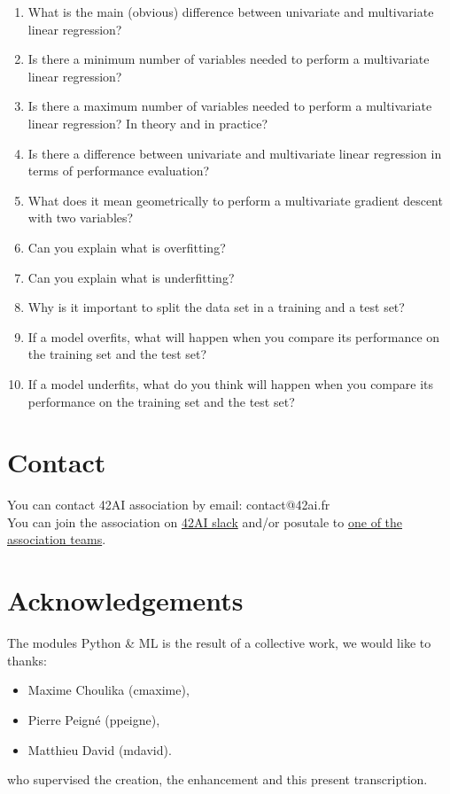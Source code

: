 \documentclass{42-en}
\begin{document}
\begin{enumerate}
  \item What is the main (obvious) difference between univariate and multivariate linear regression?
  \item Is there a minimum number of variables needed to perform a multivariate linear regression?
  \item Is there a maximum number of variables needed to perform a multivariate linear regression?
        In theory and in practice?
  \item Is there a difference between univariate and multivariate linear regression in terms of performance evaluation?
  \item What does it mean geometrically to perform a multivariate gradient descent with two variables?
  \item Can you explain what is overfitting?
  \item Can you explain what is underfitting?
  \item Why is it important to split the data set in a training and a test set?
  \item If a model overfits, what will happen when you compare its performance on the training set and the test set?
  \item If a model underfits, what do you think will happen when you compare its performance on the training set and the test set?
\end{enumerate}


\newpage

\section*{Contact}
You can contact 42AI association by email: contact@42ai.fr\\
You can join the association on \href{https://join.slack.com/t/42-ai/shared_invite/zt-ebccw5r7-YPkDM6xOiYRPjqJXkrKgcA}{42AI slack}
and/or posutale to \href{https://forms.gle/VAFuREWaLmaqZw2D8}{one of the association teams}.

\section*{Acknowledgements}
The modules Python \& ML is the result of a collective work, we would like to thanks:
\begin{itemize}
  \item Maxime Choulika (cmaxime),
  \item Pierre Peigné (ppeigne),
  \item Matthieu David (mdavid).
\end{itemize}
who supervised the creation, the enhancement and this present transcription.
\end{document}
